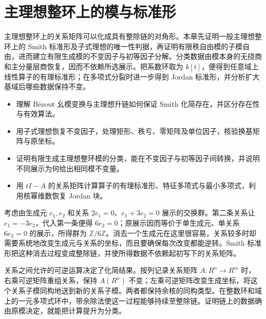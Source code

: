 
\chapter{主理想整环上的模与标准形}
\label{b2:ch:04}

\begin{chapterabstract}
	主理想整环上的关系矩阵可以化成具有整除链的对角形。本章先证明一般主理想整环上的 Smith 标准形及子式理想的唯一性判据，再证明有限秩自由模的子模自由，进而建立有限生成模的不变因子与初等因子分解。分类数据由模本身的无挠商和主分量层商恢复，因而不依赖所选展示。把系数环取为 \(k[t]\)，便得到任意域上线性算子的有理标准形；在多项式分裂时进一步得到 Jordan 标准形，并分析扩大基域后哪些数据保持不变。
\end{chapterabstract}

\begin{learninggoals}
	\begin{itemize}
		\item 理解 Bézout 幺模变换与主理想升链如何保证 Smith 化简存在，并区分存在性与有效算法。
		\item 用子式理想恢复不变因子，处理矩形、秩亏、零矩阵及单位因子，核验换基矩阵与原坐标。
		\item 证明有限生成主理想整环模的分类，能在不变因子与初等因子间转换，并说明不同展示为何给出相同模不变量。
		\item 用 \(tI-A\) 的关系矩阵计算算子的有理标准形、特征多项式与最小多项式，利用核幂维数恢复 Jordan 块。
	\end{itemize}
\end{learninggoals}

考虑由生成元 \(e_1,e_2\) 和关系 \(2e_1=0\)、\(e_1+3e_2=0\) 展示的交换群。第二条关系让 \(e_1=-3e_2\)，代入第一条便得 \(6e_2=0\)；原展示因而等价于单生成元、单关系 \(6e_2=0\) 的展示，所得群为 \(\mathbb Z/6\mathbb Z\)。消去一个生成元在这里很容易，关系较多时却需要系统地改变生成元与关系的坐标，而且要确保每次改变都能逆转。Smith 标准形把这种消去过程变成整除链，并使所得数据不依赖起初写下的关系矩阵。

\ProseParagraphBreak

关系之间允许的可逆运算决定了化简结果。按列记录关系矩阵 \(A:R^n\to R^m\) 时，右乘可逆矩阵重组关系，保持 \(A(R^n)\) 不变；左乘可逆矩阵改变生成坐标，将这个关系子模同构地送到新的关系子模。两者都保持余核的同构类型。在整数环和域上的一元多项式环中，带余除法使这一过程能够持续至整除链。证明链上的数据确由原模决定，就能把计算提升为分类。


